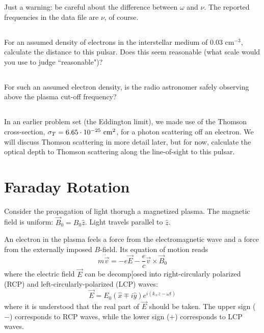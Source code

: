 \documentclass[11pt]{article}
\begin{document}
Just a warning: be careful about the difference between $\omega$ and $\nu$.  The reported frequencies in
the data file are $\nu$, of course.

\subsection{}
For an assumed density of electrons in the interstellar medium of 0.03 cm$^{-3}$, calculate the
distance to this pulsar. Does this seem reasonable (what scale would you use to judge ``reasonable")?

\subsection{}
For such an assumed electron density, is the radio astronomer safely observing above the plasma cut-off frequency?

\subsection{}
In an earlier problem set (the Eddington limit),
we made use of the Thomson cross-section, $\sigma_T=6.65\cdot10^{-25}~{\rm cm}^2$,
for a photon scattering off an electron. We will discuss Thomson scattering in more detail later, but
for now,
calculate the optical depth to Thomson scattering along the line-of-sight to this pulsar.

\section{Faraday Rotation}

Consider the propagation of light thorugh a magnetized plasma.  The magnetic field is uniform: $\vec B_0=B_0\hat z$.
Light travels parallel to $\hat z$.

An electron in the plasma feels a force from the electromagnetic wave and a force from the externally imposed
$B$-field.  Its equation of motion reads
\begin{equation}
m\dot \vec v=-e\vec E-\frac{e}{c}\vec v\times \vec B_0
\end{equation}
where the electric field $\vec E$ can be decomp[osed into right-circularly polarized (RCP) and
left-circularly-polarized (LCP) waves:
\begin{equation}
\vec E=E_0(\hat x\mp i\hat y)e^{i(k_\mp z-\omega t)}
\end{equation}
where it is understood that the real part of $\vec E$ should be taken.  The upper sign ($-$) corresponds
to RCP waves, while the lower sign ($+$) corresponds to LCP waves.
\end{document}
